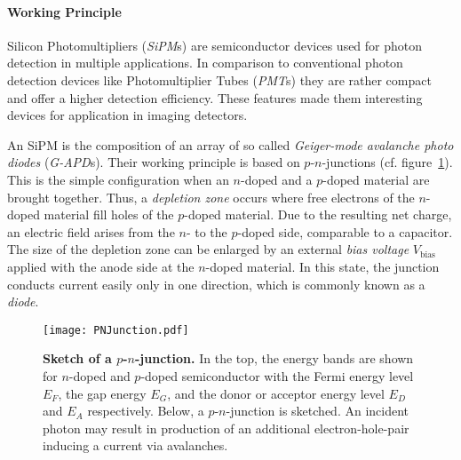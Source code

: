 \paragraph{Working Principle}\label{sec:sipm:working_principle}

Silicon Photomultipliers (\textit{SiPM}s) are semiconductor devices used for photon detection in multiple applications. In comparison to conventional photon detection devices like Photomultiplier Tubes (\textit{PMT}s) they are rather compact and offer a higher detection efficiency. These features made them interesting devices for application in imaging detectors.

An SiPM is the composition of an array of so called \textit{Geiger-mode avalanche photo diodes} (\mbox{\textit{G-APD}s}). Their working principle is based on $p$-$n$-junctions (cf. figure~\ref{sipm:pn_junction}). This is the simple configuration when an $n$-doped and a $p$-doped material are brought together. Thus, a \textit{depletion zone} occurs where free electrons of the $n$-doped material fill holes of the $p$-doped material. Due to the resulting net charge, an electric field arises from the $n$- to the $p$-doped side, comparable to a capacitor. The size of the depletion zone can be enlarged by an external \textit{bias voltage} $V_\text{bias}$ applied with the anode side at the $n$-doped material. In this state, the junction conducts current easily only in one direction, which is commonly known as a \textit{diode}. \cite{pn:simon}

\begin{figure}[H]
	\centering
	\texttt{[image: PNJunction.pdf]}
	\caption[Sketch of a $p$-$n$-junction]{\textbf{Sketch of a $p$-$n$-junction.} \cite{iceact:camera} In the top, the energy bands are shown for $n$-doped and $p$-doped semiconductor with the Fermi energy level $E_F$, the gap energy $E_G$, and the donor or acceptor energy level $E_D$ and $E_A$ respectively. Below, a $p$-$n$-junction is sketched. An incident photon may result in production of an additional electron-hole-pair inducing a current via avalanches.}
	\label{sipm:pn_junction}	
\end{figure}

